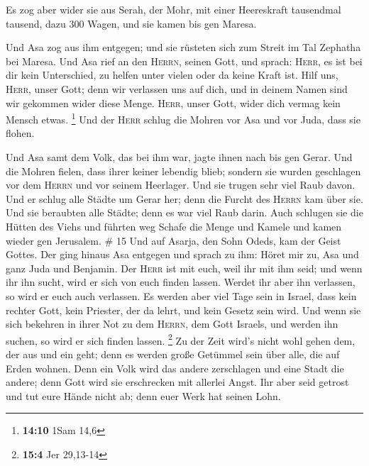  Es zog aber wider sie aus Serah, der Mohr, mit einer
Heereskraft tausendmal tausend, dazu 300 Wagen, und sie kamen bis gen
Maresa.

 Und Asa zog aus ihm entgegen; und sie rüsteten sich zum
Streit im Tal Zephatha bei Maresa.  Und Asa rief an den
\textsc{Herrn}, seinen Gott, und sprach: \textsc{Herr}, es ist bei dir
kein Unterschied, zu helfen unter vielen oder da keine Kraft ist. Hilf
uns, \textsc{Herr}, unser Gott; denn wir verlassen uns auf dich, und in
deinem Namen sind wir gekommen wider diese Menge. \textsc{Herr}, unser
Gott, wider dich vermag kein Mensch etwas. \footnote{\textbf{14:10} 1Sam
  14,6}  Und der \textsc{Herr} schlug die Mohren vor Asa
und vor Juda, dass sie flohen.

 Und Asa samt dem Volk, das bei ihm war, jagte ihnen nach
bis gen Gerar. Und die Mohren fielen, dass ihrer keiner lebendig blieb;
sondern sie wurden geschlagen vor dem \textsc{Herrn} und vor seinem
Heerlager. Und sie trugen sehr viel Raub davon.  Und er
schlug alle Städte um Gerar her; denn die Furcht des \textsc{Herrn} kam
über sie. Und sie beraubten alle Städte; denn es war viel Raub darin.
 Auch schlugen sie die Hütten des Viehs und führten weg
Schafe die Menge und Kamele und kamen wieder gen Jerusalem. \# 15
 Und auf Asarja, den Sohn Odeds, kam der Geist Gottes.
 Der ging hinaus Asa entgegen und sprach zu ihm: Höret mir
zu, Asa und ganz Juda und Benjamin. Der \textsc{Herr} ist mit euch, weil
ihr mit ihm seid; und wenn ihr ihn sucht, wird er sich von euch finden
lassen. Werdet ihr aber ihn verlassen, so wird er euch auch verlassen.
 Es werden aber viel Tage sein in Israel, dass kein
rechter Gott, kein Priester, der da lehrt, und kein Gesetz sein wird.
 Und wenn sie sich bekehren in ihrer Not zu dem
\textsc{Herrn}, dem Gott Israels, und werden ihn suchen, so wird er sich
finden lassen. \footnote{\textbf{15:4} Jer 29,13-14}  Zu
der Zeit wird's nicht wohl gehen dem, der aus und ein geht; denn es
werden große Getümmel sein über alle, die auf Erden wohnen.
 Denn ein Volk wird das andere zerschlagen und eine Stadt
die andere; denn Gott wird sie erschrecken mit allerlei Angst.
 Ihr aber seid getrost und tut eure Hände nicht ab; denn
euer Werk hat seinen Lohn.

